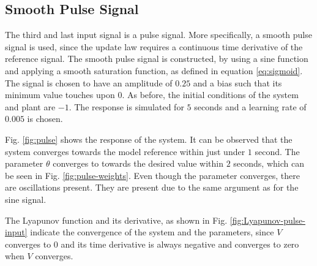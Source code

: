 \subsection{Smooth Pulse Signal}
The third and last input signal is a pulse signal. More specifically, a smooth pulse signal is used, since the update law requires a continuous time derivative of the reference signal. The smooth pulse signal is constructed, by using a sine function and applying a smooth saturation function, as defined in equation \eqref{eq:sigmoid}. The signal is chosen to have an amplitude of $0.25$ and a bias such that its minimum value touches upon $0$. As before, the initial conditions of the system and plant are $-1$. The response is simulated for $5$ seconds and a learning rate of $0.005$ is chosen.

Fig. \ref{fig:pulse} shows the response of the system. It can be observed that the system converges towards the model reference within just under $1$ second. The parameter $\theta$ converges to towards the desired value within $2$ seconds, which can be seen in Fig. \ref{fig:pulse-weights}. Even though the parameter converges, there are oscillations present. They are present due to the same argument as for the sine signal.

The Lyapunov function and its derivative, as shown in Fig. \ref{fig:Lyapunov-pulse-input} indicate the convergence of the system and the parameters, since $V$ converges to $0$ and its time derivative is always negative and converges to zero when $V$ converges.

